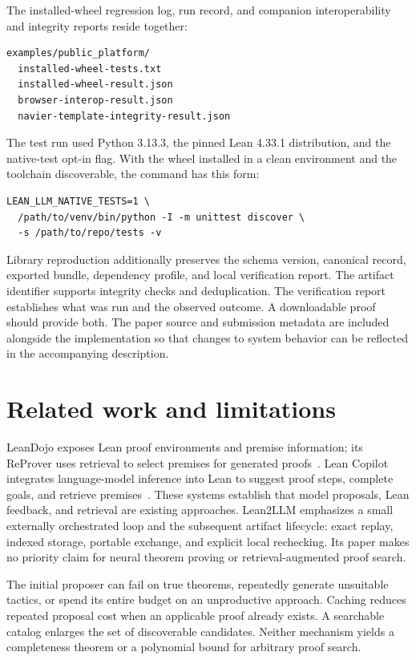 \documentclass[10pt,a4paper]{article}
\begin{document}
The installed-wheel regression log, run record, and companion interoperability
and integrity reports reside together:
\begin{lstlisting}
examples/public_platform/
  installed-wheel-tests.txt
  installed-wheel-result.json
  browser-interop-result.json
  navier-template-integrity-result.json
\end{lstlisting}
The test run used Python 3.13.3, the pinned Lean 4.33.1 distribution, and the
native-test opt-in flag. With the wheel installed in a clean environment and
the toolchain discoverable, the command has this form:
\begin{lstlisting}
LEAN_LLM_NATIVE_TESTS=1 \
  /path/to/venv/bin/python -I -m unittest discover \
  -s /path/to/repo/tests -v
\end{lstlisting}

Library reproduction additionally preserves the schema version, canonical
record, exported bundle, dependency profile, and local verification report.
The artifact identifier supports integrity checks and deduplication. The
verification report establishes what was run and the observed outcome. A
downloadable proof should provide both. The paper source and submission
metadata are included alongside the implementation so that changes to system
behavior can be reflected in the accompanying description.

\section{Related work and limitations}
LeanDojo exposes Lean proof environments and premise information; its ReProver
uses retrieval to select premises for generated proofs~\cite{leandojo}.
Lean Copilot integrates language-model inference into Lean to suggest proof
steps, complete goals, and retrieve premises~\cite{leancopilot}. These systems
establish that model proposals, Lean feedback, and retrieval are existing
approaches. Lean2LLM emphasizes a small externally orchestrated loop and the
subsequent artifact lifecycle: exact replay, indexed storage, portable exchange,
and explicit local rechecking. Its paper makes no priority claim for neural
theorem proving or retrieval-augmented proof search.

The initial proposer can fail on true theorems, repeatedly generate unsuitable
tactics, or spend its entire budget on an unproductive approach. Caching reduces
repeated proposal cost when an applicable proof already exists. A searchable
catalog enlarges the set of discoverable candidates. Neither mechanism yields
a completeness theorem or a polynomial bound for arbitrary proof search.
\end{document}
